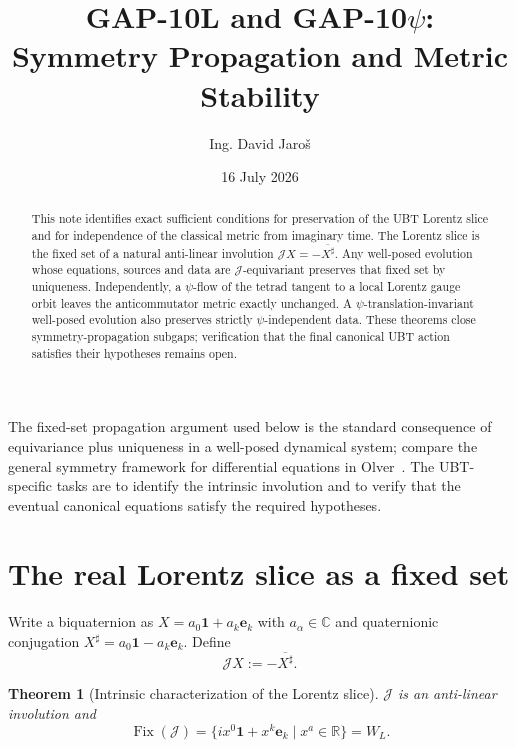 \documentclass[12pt,a4paper]{article}
\title{GAP-10L and GAP-10$\psi$: Symmetry Propagation and Metric Stability}
\author{Ing. David Jaro\v{s}}
\date{16 July 2026}
\newtheorem{theorem}[definition]{Theorem}
\theoremstyle{remark}\newtheorem{remark}[definition]{Remark}
\begin{document}
\maketitle
\UBTProvenanceNotice

\begin{abstract}
This note identifies exact sufficient conditions for preservation of the UBT
Lorentz slice and for independence of the classical metric from imaginary
time.  The Lorentz slice is the fixed set of a natural anti-linear involution
$\mathcal JX=-\overline{X^\sharp}$.  Any well-posed evolution whose equations,
sources and data are $\mathcal J$-equivariant preserves that fixed set by
uniqueness.  Independently, a $\psi$-flow of the tetrad tangent to a local
Lorentz gauge orbit leaves the anticommutator metric exactly unchanged.  A
$\psi$-translation-invariant well-posed evolution also preserves strictly
$\psi$-independent data.  These theorems close symmetry-propagation subgaps;
verification that the final canonical UBT action satisfies their hypotheses
remains open.
\end{abstract}

The fixed-set propagation argument used below is the standard consequence of
equivariance plus uniqueness in a well-posed dynamical system; compare the
general symmetry framework for differential equations in
Olver~\cite{olver1993}.  The UBT-specific tasks are to identify the intrinsic
involution and to verify that the eventual canonical equations satisfy the
required hypotheses.

\section{The real Lorentz slice as a fixed set}
Write a biquaternion as $X=a_0\mathbf1+a_k\mathbf e_k$ with $a_\alpha\in\mathbb C$
and quaternionic conjugation
$X^\sharp=a_0\mathbf1-a_k\mathbf e_k$.  Define
\begin{equation}
 \boxed{\mathcal JX:=-\overline{X^\sharp}.}
 \label{eq:J}
\end{equation}

\begin{theorem}[Intrinsic characterization of the Lorentz slice]
$\mathcal J$ is an anti-linear involution and
\begin{equation}
 \operatorname{Fix}(\mathcal J)
 =\{i x^0\mathbf1+x^k\mathbf e_k\mid x^a\in\mathbb R\}
 =W_L.
\end{equation}
\end{theorem}
\end{document}
